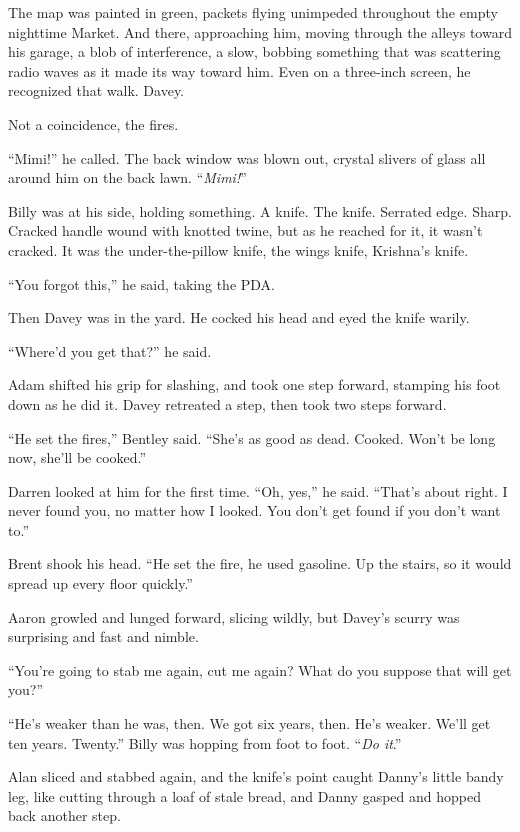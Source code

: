The map was painted in green, packets flying unimpeded throughout the
empty nighttime Market.  And there, approaching him, moving through
the alleys toward his garage, a blob of interference, a slow, bobbing
something that was scattering radio waves as it made its way toward
him.  Even on a three-inch screen, he recognized that walk.  Davey.

Not a coincidence, the fires.

``Mimi!'' he called.  The back window was blown out, crystal slivers
of glass all around him on the back lawn.  ``\textit{Mimi!}''

Billy was at his side, holding something.  A knife.  The knife. 
Serrated edge.  Sharp.  Cracked handle wound with knotted twine, but
as he reached for it, it wasn't cracked.  It was the under-the-pillow
knife, the wings knife, Krishna's knife.

``You forgot this,'' he said, taking the PDA.

Then Davey was in the yard.  He cocked his head and eyed the knife
warily.

``Where'd you get that?'' he said.

Adam shifted his grip for slashing, and took one step forward,
stamping his foot down as he did it.  Davey retreated a step, then
took two steps forward.

``He set the fires,'' Bentley said.  ``She's as good as dead.  Cooked. 
Won't be long now, she'll be cooked.''

Darren looked at him for the first time.  ``Oh, yes,'' he said. 
``That's about right.  I never found you, no matter how I looked.  You
don't get found if you don't want to.''

Brent shook his head.  ``He set the fire, he used gasoline.  Up the
stairs, so it would spread up every floor quickly.''

Aaron growled and lunged forward, slicing wildly, but Davey's scurry
was surprising and fast and nimble.

``You're going to stab me again, cut me again?  What do you suppose
that will get you?''

``He's weaker than he was, then.  We got six years, then.  He's
weaker.  We'll get ten years.  Twenty.'' Billy was hopping from foot
to foot.  ``\textit{Do it}.''

Alan sliced and stabbed again, and the knife's point caught Danny's
little bandy leg, like cutting through a loaf of stale bread, and
Danny gasped and hopped back another step.

